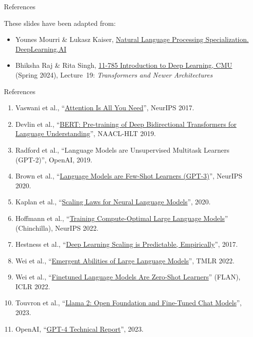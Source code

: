 \begin{frame}{References}
  \begin{flushleft}
    These slides have been adapted from:
    \begin{itemize}
      \item[$\blacktriangleright$] Younes Mourri \& Lukasz Kaiser,
        \href{https://www.deeplearning.ai/courses/natural-language-processing-specialization/}{Natural Language Processing Specialization. DeepLearning.AI}
      \item[$\blacktriangleright$] Bhiksha Raj \& Rita Singh,
        \href{https://deeplearning.cs.cmu.edu/}{11-785 Introduction to Deep Learning, CMU} (Spring 2024), Lecture~19: \textit{Transformers and Newer Architectures}
    \end{itemize}
  \end{flushleft}
\end{frame}

\begin{frame}{References}
  \scriptsize
  \begin{enumerate}\itemsep0.15em
    \item Vaswani et al., ``\href{https://arxiv.org/abs/1706.03762}{Attention Is All You Need}'', NeurIPS 2017.
    \item Devlin et al., ``\href{https://arxiv.org/abs/1810.04805}{BERT: Pre-training of Deep Bidirectional Transformers for Language Understanding}'', NAACL-HLT 2019.
    \item Radford et al., ``Language Models are Unsupervised Multitask Learners (GPT-2)'', OpenAI, 2019.
    \item Brown et al., ``\href{https://arxiv.org/abs/2005.14165}{Language Models are Few-Shot Learners (GPT-3)}'', NeurIPS 2020.
    \item Kaplan et al., ``\href{https://arxiv.org/abs/2001.08361}{Scaling Laws for Neural Language Models}'', 2020.
    \item Hoffmann et al., ``\href{https://arxiv.org/abs/2203.15556}{Training Compute-Optimal Large Language Models}'' (Chinchilla), NeurIPS 2022.
    \item Hestness et al., ``\href{https://arxiv.org/abs/1712.00409}{Deep Learning Scaling is Predictable, Empirically}'', 2017.
    \item Wei et al., ``\href{https://arxiv.org/abs/2206.07682}{Emergent Abilities of Large Language Models}'', TMLR 2022.
    \item Wei et al., ``\href{https://arxiv.org/abs/2109.01652}{Finetuned Language Models Are Zero-Shot Learners}'' (FLAN), ICLR 2022.
    \item Touvron et al., ``\href{https://arxiv.org/abs/2307.09288}{Llama 2: Open Foundation and Fine-Tuned Chat Models}'', 2023.
    \item OpenAI, ``\href{https://arxiv.org/abs/2303.08774}{GPT-4 Technical Report}'', 2023.
  \end{enumerate}
\end{frame}

